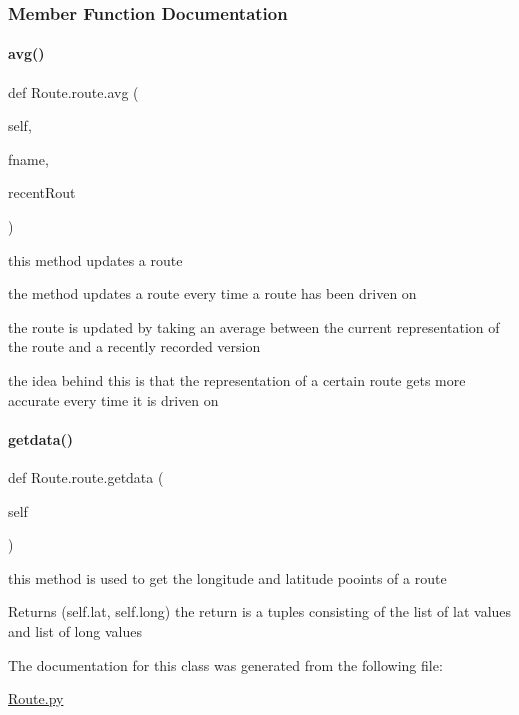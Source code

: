 \subsubsection{Member Function Documentation}
\mbox{\label{class_route_1_1route_a00d420899160e63206c2906f3bde69bb}} 
\paragraph{\texorpdfstring{avg()}{avg()}}
{\footnotesize\ttfamily def Route.\+route.\+avg (\begin{DoxyParamCaption}\item[{}]{self,  }\item[{}]{fname,  }\item[{}]{recent\+Rout }\end{DoxyParamCaption})}



this method updates a route 

the method updates a route every time a route has been driven on

the route is updated by taking an average between the current representation of the route and a recently recorded version

the idea behind this is that the representation of a certain route gets more accurate every time it is driven on \mbox{\label{class_route_1_1route_a52023b570a22876d84fb67395dc7fbeb}} 
\paragraph{\texorpdfstring{getdata()}{getdata()}}
{\footnotesize\ttfamily def Route.\+route.\+getdata (\begin{DoxyParamCaption}\item[{}]{self }\end{DoxyParamCaption})}



this method is used to get the longitude and latitude pooints of a route 

\begin{DoxyReturn}{Returns}
(self.\+lat, self.\+long) the return is a tuples consisting of the list of lat values and list of long values 
\end{DoxyReturn}


The documentation for this class was generated from the following file\+:\begin{DoxyCompactItemize}
\item 
\mbox{\hyperlink{_route_8py}{Route.\+py}}\end{DoxyCompactItemize}
